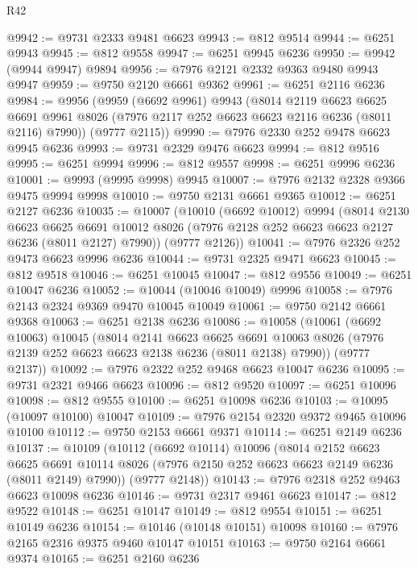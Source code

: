 \begin{lexlean}{R42}
\begin{coremodule}
{@9942 := @9731 @2333 @9481 @6623
@9943 := @812 @9514
@9944 := @6251 @9943
@9945 := @812 @9558
@9947 := @6251 @9945 @6236
@9950 := @9942 (@9944 @9947) @9894
@9956 := @7976 @2121 @2332 @9363 @9480 @9943 @9947
@9959 := @9750 @2120 @6661 @9362
@9961 := @6251 @2116 @6236
@9984 := @9956
    (@9959
      (@6692 @9961)
      @9943
      (@8014
        @2119
        @6623
        @6625
        @6691
        @9961
        @8026
        (@7976 @2117 @252 @6623 @6623 @2116 @6236 (@8011 @2116) @7990))
      (@9777 @2115))
@9990 := @7976 @2330 @252 @9478 @6623 @9945 @6236
@9993 := @9731 @2329 @9476 @6623
@9994 := @812 @9516
@9995 := @6251 @9994
@9996 := @812 @9557
@9998 := @6251 @9996 @6236
@10001 := @9993 (@9995 @9998) @9945
@10007 := @7976 @2132 @2328 @9366 @9475 @9994 @9998
@10010 := @9750 @2131 @6661 @9365
@10012 := @6251 @2127 @6236
@10035 := @10007
    (@10010
      (@6692 @10012)
      @9994
      (@8014
        @2130
        @6623
        @6625
        @6691
        @10012
        @8026
        (@7976 @2128 @252 @6623 @6623 @2127 @6236 (@8011 @2127) @7990))
      (@9777 @2126))
@10041 := @7976 @2326 @252 @9473 @6623 @9996 @6236
@10044 := @9731 @2325 @9471 @6623
@10045 := @812 @9518
@10046 := @6251 @10045
@10047 := @812 @9556
@10049 := @6251 @10047 @6236
@10052 := @10044 (@10046 @10049) @9996
@10058 := @7976 @2143 @2324 @9369 @9470 @10045 @10049
@10061 := @9750 @2142 @6661 @9368
@10063 := @6251 @2138 @6236
@10086 := @10058
    (@10061
      (@6692 @10063)
      @10045
      (@8014
        @2141
        @6623
        @6625
        @6691
        @10063
        @8026
        (@7976 @2139 @252 @6623 @6623 @2138 @6236 (@8011 @2138) @7990))
      (@9777 @2137))
@10092 := @7976 @2322 @252 @9468 @6623 @10047 @6236
@10095 := @9731 @2321 @9466 @6623
@10096 := @812 @9520
@10097 := @6251 @10096
@10098 := @812 @9555
@10100 := @6251 @10098 @6236
@10103 := @10095 (@10097 @10100) @10047
@10109 := @7976 @2154 @2320 @9372 @9465 @10096 @10100
@10112 := @9750 @2153 @6661 @9371
@10114 := @6251 @2149 @6236
@10137 := @10109
    (@10112
      (@6692 @10114)
      @10096
      (@8014
        @2152
        @6623
        @6625
        @6691
        @10114
        @8026
        (@7976 @2150 @252 @6623 @6623 @2149 @6236 (@8011 @2149) @7990))
      (@9777 @2148))
@10143 := @7976 @2318 @252 @9463 @6623 @10098 @6236
@10146 := @9731 @2317 @9461 @6623
@10147 := @812 @9522
@10148 := @6251 @10147
@10149 := @812 @9554
@10151 := @6251 @10149 @6236
@10154 := @10146 (@10148 @10151) @10098
@10160 := @7976 @2165 @2316 @9375 @9460 @10147 @10151
@10163 := @9750 @2164 @6661 @9374
@10165 := @6251 @2160 @6236
}
\end{coremodule}
\end{lexlean}
